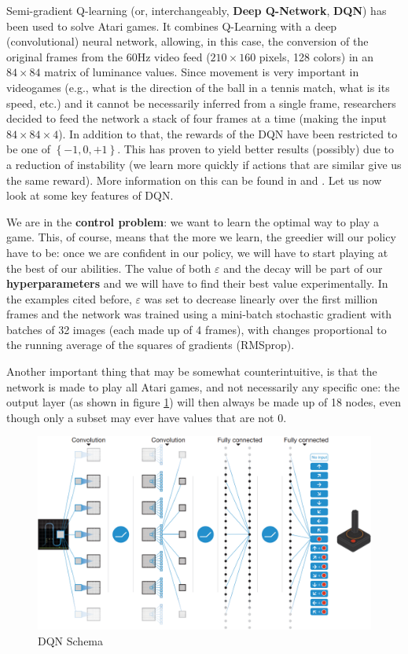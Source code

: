 Semi-gradient Q-learning (or, interchangeably, \textbf{Deep Q-Network}, \textbf{DQN}) has been used to solve Atari games. It combines Q-Learning with a deep (convolutional) neural network, allowing, in this case, the conversion of the original frames from the 60Hz video feed ($210 \times 160$ pixels, 128 colors) in an $84 \times 84$ matrix of luminance values. Since movement is very important in videogames (e.g., what is the direction of the ball in a tennis match, what is its speed, etc.) and it cannot be necessarily inferred from a single frame, researchers decided to feed the network a stack of four frames at a time (making the input $84 \times 84 \times 4$). In addition to that, the rewards of the DQN have been restricted to be one of $\left\{-1,0,+1\right\}$. This has proven to yield better results (possibly) due to a reduction of instability (we learn more quickly if actions that are similar give us the same reward). More information on this can be found in \cite{mnih2013atari} and \cite{mnih2015humanlevel}. Let us now look at some key features of DQN.

We are in the \textbf{control problem}: we want to learn the optimal way to play a game. This, of course, means that the more we learn, the greedier will our policy have to be: once we are confident in our policy, we will have to start playing at the best of our abilities. The value of both $\varepsilon$ and the decay will be part of our \textbf{hyperparameters} and we will have to find their best value experimentally. In the examples cited before, $\varepsilon$ was set to decrease linearly over the first million frames and the network was trained using a mini-batch stochastic gradient with batches of 32 images (each made up of 4 frames), with changes proportional to the running average of the squares of gradients (RMSprop).

Another important thing that may be somewhat counterintuitive, is that the network is made to play all Atari games, and not necessarily any specific one: the output layer (as shown in figure \ref{fig:ch7-dqnschema}) will then always be made up of 18 nodes, even though only a subset may ever have values that are not 0.

\begin{figure}
    \centering
    \includegraphics[scale=0.4]{Images/Chapter 7/ataridqn.png}
    \caption{DQN Schema}
    \label{fig:ch7-dqnschema}
\end{figure}

